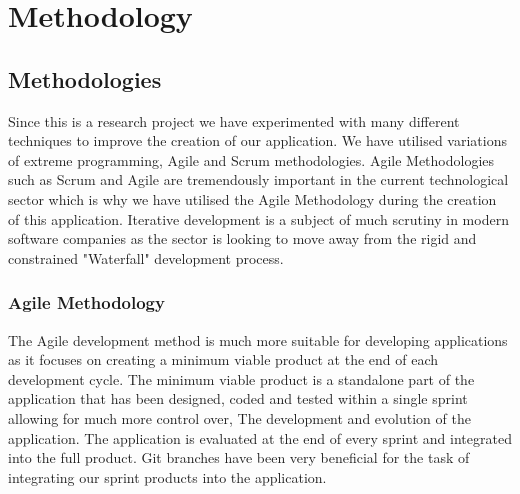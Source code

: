 \begin{itemize}
\begin{enumerate}
\begin{itemize}
            \end{itemize}
        \end{enumerate}
    \end{itemize}
    
    
\chapter{Methodology}

\section{Methodologies}
  
  Since this is a research project we have experimented with many different techniques to improve the creation of our application. We have utilised variations of extreme programming, 
  Agile and Scrum methodologies. 
  Agile Methodologies such as Scrum and Agile are tremendously important in the current technological sector which is why we have utilised the Agile Methodology during the creation of this application\cite{agile}. 
  Iterative development is a subject of much scrutiny in modern software companies as the sector is looking to move away from the rigid and constrained "Waterfall" development process\cite{agilewaterfall}. 
  
  
  \subsection{Agile Methodology}
  The Agile development method is much more suitable for developing applications as it focuses on creating a minimum viable product at the end of each development cycle. 
  The minimum viable product is a standalone part of the application that has been designed, coded and tested within a single sprint allowing for much more control over, 
  The development and evolution of the application. The application is evaluated at the end of every sprint and integrated into the full product. 
  Git branches have been very beneficial for the task of integrating our sprint products into the application. 
  
